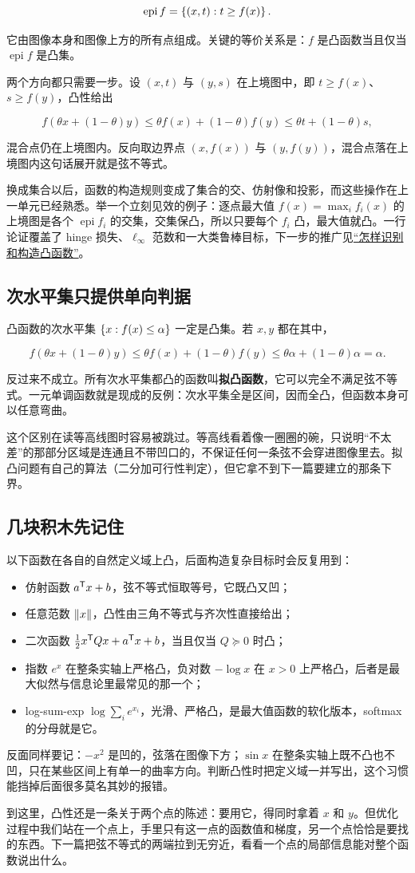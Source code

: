 \[
\operatorname{epi}f=\left\{(x,t):t\ge f(x)\right\}.
\]

它由图像本身和图像上方的所有点组成。关键的等价关系是：\(f\) 是凸函数当且仅当 \(\operatorname{epi}f\) 是凸集。

两个方向都只需要一步。设 \((x,t)\) 与 \((y,s)\) 在上境图中，即 \(t\ge f(x)\)、\(s\ge f(y)\)，凸性给出

\[
f(\theta x+(1-\theta)y)
\le
\theta f(x)+(1-\theta)f(y)
\le
\theta t+(1-\theta)s,
\]

混合点仍在上境图内。反向取边界点 \((x,f(x))\) 与 \((y,f(y))\)，混合点落在上境图内这句话展开就是弦不等式。

换成集合以后，函数的构造规则变成了集合的交、仿射像和投影，而这些操作在上一单元已经熟悉。举一个立刻见效的例子：逐点最大值 \(f(x)=\max_i f_i(x)\) 的上境图是各个 \(\operatorname{epi}f_i\) 的交集，交集保凸，所以只要每个 \(f_i\) 凸，最大值就凸。一行论证覆盖了 hinge 损失、\(\ell_\infty\) 范数和一大类鲁棒目标，下一步的推广见\hyperref[sec:09-Convex-Optimization/03-Convex-Functions/04]{``怎样识别和构造凸函数''}。

\subsection{次水平集只提供单向判据}

凸函数的次水平集 \(\left\{x:f(x)\le\alpha\right\}\) 一定是凸集。若 \(x,y\) 都在其中，

\[
f(\theta x+(1-\theta)y)
\le
\theta f(x)+(1-\theta)f(y)
\le
\theta\alpha+(1-\theta)\alpha=\alpha.
\]

反过来不成立。所有次水平集都凸的函数叫\textbf{拟凸函数}，它可以完全不满足弦不等式。一元单调函数就是现成的反例：次水平集全是区间，因而全凸，但函数本身可以任意弯曲。

这个区别在读等高线图时容易被跳过。等高线看着像一圈圈的碗，只说明``不太差''的那部分区域是连通且不带凹口的，不保证任何一条弦不会穿进图像里去。拟凸问题有自己的算法（二分加可行性判定），但它拿不到下一篇要建立的那条下界。

\subsection{几块积木先记住}

以下函数在各自的自然定义域上凸，后面构造复杂目标时会反复用到：

\begin{itemize}
\tightlist
\item
  仿射函数 \(a^{\mathsf{T}}x+b\)，弦不等式恒取等号，它既凸又凹；
\item
  任意范数 \(\left\lVert x\right\rVert\)，凸性由三角不等式与齐次性直接给出；
\item
  二次函数 \(\frac12x^{\mathsf{T}}Qx+a^{\mathsf{T}}x+b\)，当且仅当 \(Q\succeq0\) 时凸；
\item
  指数 \(e^x\) 在整条实轴上严格凸，负对数 \(-\log x\) 在 \(x>0\) 上严格凸，后者是最大似然与信息论里最常见的那一个；
\item
  log-sum-exp \(\log\sum_i e^{x_i}\)，光滑、严格凸，是最大值函数的软化版本，softmax 的分母就是它。
\end{itemize}

反面同样要记：\(-x^2\) 是凹的，弦落在图像下方；\(\sin x\) 在整条实轴上既不凸也不凹，只在某些区间上有单一的曲率方向。判断凸性时把定义域一并写出，这个习惯能挡掉后面很多莫名其妙的报错。

到这里，凸性还是一条关于两个点的陈述：要用它，得同时拿着 \(x\) 和 \(y\)。但优化过程中我们站在一个点上，手里只有这一点的函数值和梯度，另一个点恰恰是要找的东西。下一篇把弦不等式的两端拉到无穷近，看看一个点的局部信息能对整个函数说出什么。
